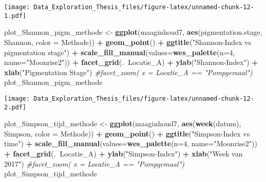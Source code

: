 \documentclass[]{article}
\newenvironment{Shaded}{\begin{snugshade}}{\end{snugshade}}
\newcommand{\KeywordTok}[1]{\textcolor[rgb]{0.13,0.29,0.53}{\textbf{#1}}}
\newcommand{\DataTypeTok}[1]{\textcolor[rgb]{0.13,0.29,0.53}{#1}}
\newcommand{\DecValTok}[1]{\textcolor[rgb]{0.00,0.00,0.81}{#1}}
\newcommand{\StringTok}[1]{\textcolor[rgb]{0.31,0.60,0.02}{#1}}
\newcommand{\CommentTok}[1]{\textcolor[rgb]{0.56,0.35,0.01}{\textit{#1}}}
\newcommand{\OperatorTok}[1]{\textcolor[rgb]{0.81,0.36,0.00}{\textbf{#1}}}
\newcommand{\NormalTok}[1]{#1}
\begin{document}
\texttt{[image: Data\_Exploration\_Thesis\_files/figure-latex/unnamed-chunk-12-1.pdf]}

\begin{Shaded}
\begin{Highlighting}[]
\NormalTok{plot_Shannon_pigm_methode <-}\StringTok{ }\KeywordTok{ggplot}\NormalTok{(maaginhoud7, }\KeywordTok{aes}\NormalTok{(pigmentation.stage, Shannon, }\DataTypeTok{color =}\NormalTok{ Methode)) }\OperatorTok{+}
\StringTok{  }\KeywordTok{geom_point}\NormalTok{() }\OperatorTok{+}
\StringTok{  }\KeywordTok{ggtitle}\NormalTok{(}\StringTok{"Shannon-Index vs pigmentation stage"}\NormalTok{) }\OperatorTok{+}
\StringTok{  }\KeywordTok{scale_fill_manual}\NormalTok{(}\DataTypeTok{values=}\KeywordTok{wes_palette}\NormalTok{(}\DataTypeTok{n=}\DecValTok{4}\NormalTok{, }\DataTypeTok{name=}\StringTok{"Moonrise2"}\NormalTok{)) }\OperatorTok{+}\StringTok{ }
\StringTok{  }\KeywordTok{facet_grid}\NormalTok{(.}\OperatorTok{~}\NormalTok{Locatie_A) }\OperatorTok{+}
\StringTok{  }\KeywordTok{ylab}\NormalTok{(}\StringTok{"Shannon-Index"}\NormalTok{) }\OperatorTok{+}
\StringTok{  }\KeywordTok{xlab}\NormalTok{(}\StringTok{"Pigmentation Stage"}\NormalTok{)}
  \CommentTok{#facet_zoom( x = Locatie_A == "Pompgemaal")}
\NormalTok{plot_Shannon_pigm_methode}
\end{Highlighting}
\end{Shaded}

\texttt{[image: Data\_Exploration\_Thesis\_files/figure-latex/unnamed-chunk-12-2.pdf]}

\begin{Shaded}
\begin{Highlighting}[]
\NormalTok{plot_Simpson_tijd_methode <-}\StringTok{ }\KeywordTok{ggplot}\NormalTok{(maaginhoud7, }\KeywordTok{aes}\NormalTok{(}\KeywordTok{week}\NormalTok{(datum), Simpson, }\DataTypeTok{color =}\NormalTok{ Methode)) }\OperatorTok{+}
\StringTok{  }\KeywordTok{geom_point}\NormalTok{() }\OperatorTok{+}
\StringTok{  }\KeywordTok{ggtitle}\NormalTok{(}\StringTok{"Simpson-Index vs time"}\NormalTok{) }\OperatorTok{+}
\StringTok{  }\KeywordTok{scale_fill_manual}\NormalTok{(}\DataTypeTok{values=}\KeywordTok{wes_palette}\NormalTok{(}\DataTypeTok{n=}\DecValTok{4}\NormalTok{, }\DataTypeTok{name=}\StringTok{"Moonrise2"}\NormalTok{)) }\OperatorTok{+}\StringTok{ }
\StringTok{  }\KeywordTok{facet_grid}\NormalTok{(.}\OperatorTok{~}\NormalTok{Locatie_A) }\OperatorTok{+}
\StringTok{  }\KeywordTok{ylab}\NormalTok{(}\StringTok{"Simpson-Index"}\NormalTok{) }\OperatorTok{+}
\StringTok{  }\KeywordTok{xlab}\NormalTok{(}\StringTok{"Week van 2017"}\NormalTok{)}
  \CommentTok{#facet_zoom( x = Locatie_A == "Pompgemaal")}
\NormalTok{plot_Simpson_tijd_methode}
\end{Highlighting}
\end{Shaded}
\end{document}
